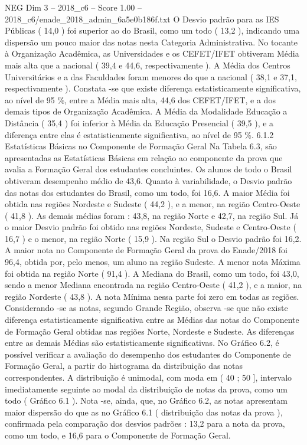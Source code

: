 \begin{textsample}{NEG Dim 3 – 2018\_c6 – Score 1.00 – 2018\_c6/enade\_2018\_admin\_6a5e0b186f.txt}
O Desvio padrão para as IES Públicas ( 14,0 ) foi superior ao do Brasil, como um todo ( 13,2 ), indicando uma dispersão um pouco maior das notas nesta Categoria Administrativa.
No tocante à Organização Acadêmica, as Universidades e os CEFET/IFET obtiveram Média mais alta que a nacional ( 39,4 e 44,6, respectivamente ).
A Média dos Centros Universitários e a das Faculdades foram menores do que a nacional ( 38,1 e 37,1, respectivamente ).
Constata -se que existe diferença estatisticamente significativa, ao nível de 95 \%, entre a Média mais alta, 44,6 dos CEFET/IFET, e a dos demais tipos de Organização Acadêmica.
A Média da Modalidade Educação a Distância ( 35,4 ) foi inferior à Média da Educação Presencial ( 39,5 ), e a diferença entre elas é estatisticamente significativa, ao nível de 95 \%. 6.1.2 Estatísticas Básicas no Componente de Formação Geral Na Tabela 6.3, são apresentadas as Estatísticas Básicas em relação ao componente da prova que avalia a Formação Geral dos estudantes concluintes.
Os alunos de todo o Brasil obtiveram desempenho médio de 43,6.
Quanto à variabilidade, o Desvio padrão das notas dos estudantes do Brasil, como um todo, foi 16,6.
A maior Média foi obtida nas regiões Nordeste e Sudeste ( 44,2 ), e a menor, na região Centro-Oeste ( 41,8 ).
As demais médias foram : 43,8, na região Norte e 42,7, na região Sul.
Já o maior Desvio padrão foi obtido nas regiões Nordeste, Sudeste e Centro-Oeste ( 16,7 ) e o menor, na região Norte ( 15,9 ).
Na região Sul o Desvio padrão foi 16,2.
A maior nota no Componente de Formação Geral da prova do Enade/2018 foi 96,4, obtida por, pelo menos, um aluno na região Sudeste.
A menor nota Máxima foi obtida na região Norte ( 91,4 ).
A Mediana do Brasil, como um todo, foi 43,0, sendo a menor Mediana encontrada na região Centro-Oeste ( 41,2 ), e a maior, na região Nordeste ( 43,8 ).
A nota Mínima nessa parte foi zero em todas as regiões.
Considerando -se as notas, segundo Grande Região, observa -se que não existe diferença estatisticamente significativa entre as Médias das notas do Componente de Formação Geral obtidas nas regiões Norte, Nordeste e Sudeste.
As diferenças entre as demais Médias são estatisticamente significativas.
No Gráfico 6.2, é possível verificar a avaliação do desempenho dos estudantes do Componente de Formação Geral, a partir do histograma da distribuição das notas correspondentes.
A distribuição é unimodal, com moda em ( 40 ; 50 ], intervalo imediatamente seguinte ao modal da distribuição de notas da prova, como um todo ( Gráfico 6.1 ).
Nota -se, ainda, que, no Gráfico 6.2, as notas apresentam maior dispersão do que as no Gráfico 6.1 ( distribuição das notas da prova ), confirmada pela comparação dos desvios padrões : 13,2 para a nota da prova, como um todo, e 16,6 para o Componente de Formação Geral.

\end{textsample}
